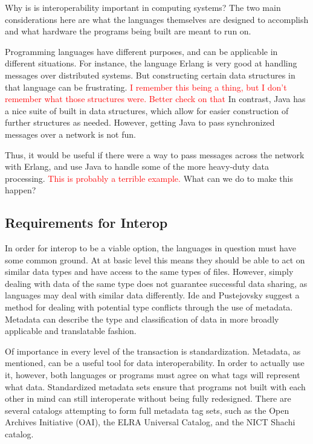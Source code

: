 \documentclass{sig-alternate}
\newcommand{\mycomment}[1]{\textcolor{red}{#1}}
\begin{document}
Why is is interoperability important in computing systems? The two main considerations here are what the languages themselves are designed to accomplish and what hardware the programs being built are meant to run on.

Programming languages have different purposes, and can be applicable in different situations. For instance, the language Erlang is very good at handling messages over distributed systems. But constructing certain data structures in that language can be frustrating. \mycomment{I remember this being a thing, but I don't remember what those structures were. Better check on that} 
In contrast, Java has a nice suite of built in data structures, which allow for easier construction of further structures as needed. However, getting Java to pass synchronized messages over a network is not fun.

Thus, it would be useful if there were a way to pass messages across the network with Erlang, and use Java to handle some of the more heavy-duty data processing. \mycomment{This is probably a terrible example.}
What can we do to make this happen?

\subsection*{Requirements for Interop}
In order for interop to be a viable option, the languages in question must have some common ground. At at basic level
this means they should be able to act on similar data types and have access to the same types of files. However, simply dealing with data of the same type does not guarantee successful data sharing, as languages may deal with similar data differently. Ide and Pustejovsky \cite{Ide:2010} suggest a method for dealing with potential type conflicts through the use of metadata. Metadata can describe the type and classification of data in more broadly applicable and translatable fashion.

Of importance in every level of the transaction is standardization. Metadata, as mentioned, can be a useful tool for data interoperability. In order to actually use it, however, both languages or programs must agree on what tags will represent what data. Standardized metadata sets ensure that programs not built with each other in mind can still interoperate without being fully redesigned. There are several catalogs attempting to form full metadata tag sets, such as the Open Archives Initiative (OAI), the ELRA Universal Catalog, and the NICT Shachi catalog.\cite{Ide:2010}
\end{document}
